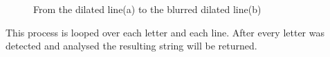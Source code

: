 \begin{figure}[H]
    \centering
    \qquad
    \caption{From the dilated line(a) to the blurred dilated line(b)}
\end{figure}

This process is looped over each letter and each line.
After every letter was detected and analysed the resulting string will be returned.
